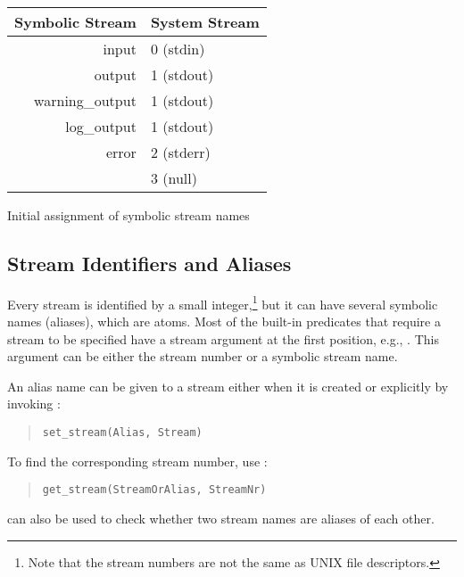 \begin{center}
\begin{tabular}{|r|l|}
\hline
Symbolic Stream &       System Stream   \\
\hline
\hline
input           &       0 (stdin)       \\
\hline
output          &       1 (stdout)      \\
warning_output  &       1 (stdout)      \\
log_output      &       1 (stdout)      \\
\hline
error           &       2 (stderr)      \\
\hline
                &       3 (null)        \\
\hline
\end{tabular}

Initial assignment of symbolic stream names
\end{center}

\subsection{Stream Identifiers and Aliases}
Every stream is identified by a small integer,\footnote{%
  Note that the stream numbers are not the same as UNIX file descriptors.}
but it can have several symbolic names (aliases), which are atoms.
Most of the built-in predicates that require a stream to be specified
have a stream argument at the first position,
e.g., . This argument can be either the stream
number or a symbolic stream name.

An alias name can be given to a stream either when it is created or
explicitly by invoking
:
\begin{quote}
\begin{verbatim}
set_stream(Alias, Stream)
\end{verbatim}
\end{quote}
To find the corresponding stream number, use
:
\begin{quote}
\begin{verbatim}
get_stream(StreamOrAlias, StreamNr)
\end{verbatim}
\end{quote}
 can also
be used to check whether two stream names are aliases of each other.


